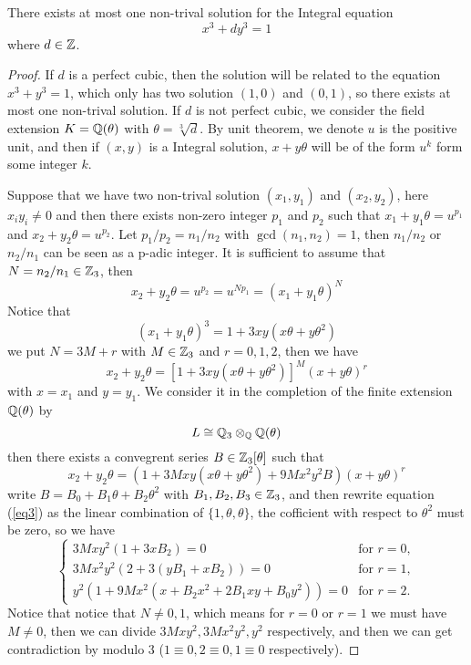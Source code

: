     
    \begin{theorem}[Skolem] There exists at most one non-trival solution for the Integral equation
        \[x^3+dy^3=1\]
    where \(d \in \mathbb{Z}\).
        \begin{proof}
            If \(d\) is a perfect cubic, then the solution will be related to the equation \(x^3+y^3=1\), which only has two solution \((1,0)\) and \((0,1)\), so there exists at most one non-trival solution. If \(d\) is not perfect cubic, we consider the field extension \(K = \mathbb{Q}(\theta)\) with \(\theta = \sqrt[3]{d}\). By unit theorem, we denote \(u\) is the positive unit, and then if \((x,y)\) is a Integral solution, \(x+y\theta\) will be of the form \(u^k\) form some integer \(k\).

            Suppose that we have two non-trival solution \((x_1,y_1)\) and \((x_2,y_2)\), here \(x_iy_i \neq 0\) and then there exists non-zero integer \(p_1\) and \(p_2\) such that \(x_1+y_1\theta = u^{p_1}\) and \(x_2+y_2\theta = u^{p_2}\). Let \(p_1/p_2 = n_1/n_2\) with \(\gcd(n_1,n_2)=1\), then \(n_1/n_2\) or \(n_2/n_1\) can be seen as a p-adic integer. It is sufficient to assume that \(N = n_2/n_1 \in \mathbb{Z}_3\), then 
            \[x_2+y_2\theta = u^{p_2} = u^{Np_1} = (x_1+y_1\theta)^N\]
            Notice that \[(x_1+y_1\theta)^3 = 1+3xy(x\theta+y\theta^2)\]
            we put \(N= 3M+r\) with \(M \in \mathbb{Z}_3\) and \(r=0,1,2\), then we have 
            \[x_2+y_2\theta = [1+3xy(x\theta+y\theta^2)]^M(x+y\theta)^r\]
            with \(x=x_1\) and \(y=y_1\). We consider it in the completion of the finite extension \(\mathbb{Q} (\theta)\) by 
            \[L \cong \mathbb{Q}_3 \otimes_{\mathbb{Q}} \mathbb{Q}(\theta)\]
            then there exists a convegrent series \(B \in \mathbb{Z}_3[\theta]\) such that
            \begin{equation} \label{eq3}
                x_2 + y_2 \theta = \left( 1 + 3M x y (x\theta + y\theta^2) + 9M x^2 y^2 B \right) (x + y\theta)^r 
            \end{equation}
            write \(B=B_0+B_1\theta+B_2\theta^2\) with \(B_1,B_2,B_3 \in \mathbb{Z}_3\), and then rewrite equation (\ref{eq3}) as the linear combination of \(\{1,\theta,\theta\}\), the cofficient with respect to \(\theta^2\) must be zero, so we have 
            \[
\begin{cases}
3M x y^2 (1 + 3x B_2)=0 & \text{for } r = 0, \\
3M x^2 y^2 \left( 2 + 3(y B_1 + x B_2) \right)=0 & \text{for } r = 1, \\
y^2 \left( 1 + 9M x^2 (x + B_2 x^2 + 2B_1 x y + B_0 y^2) \right)=0 & \text{for } r = 2.
\end{cases}
\]
            Notice that notice that \(N \neq 0, 1\), which means for \(r=0\) or \(r=1\) we must have \(M\neq 0\), then we can divide \(3Mxy^2, 3Mx^2y^2, y^2\) respectively, and then we can get contradiction by modulo 3 (\(1 \equiv 0, 2 \equiv 0, 1\equiv 0\) respectively).
                
        \end{proof}
    \end{theorem}

